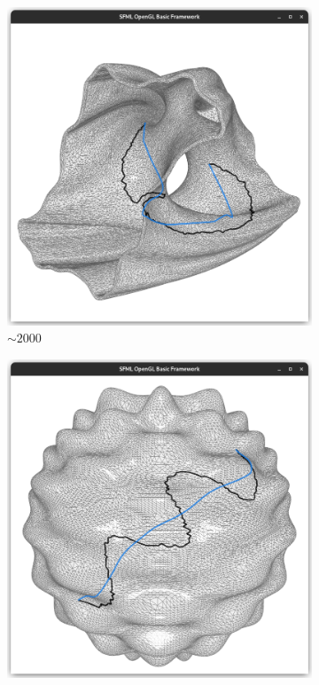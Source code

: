 \documentclass{stdlocal}
\begin{document}
\begin{figure}
  \begin{subfigure}[b]{0.24\linewidth}
    \centering
    \includegraphics[width=\linewidth,trim={25px 20 25 50},clip]{images/julia-geodesic-1.png}
    \caption{$\sim 2000$}
  \end{subfigure}
  \begin{subfigure}[b]{0.24\linewidth}
    \centering
    \includegraphics[width=\linewidth,trim={25px 20 25 50},clip]{images/harmonic-geodesic-1.png}

\end{subfigure}
\end{figure}
\end{document}
